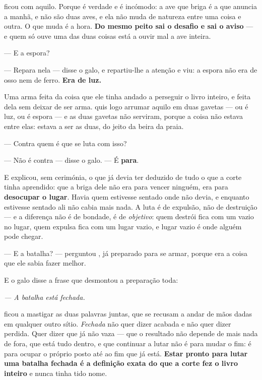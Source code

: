 \documentclass[livro.tex]{subfiles}
\begin{document}
\medskip
\noindent \Ben ficou com aquilo. Porque é verdade e é incómodo: a ave que
briga é a que anuncia a manhã, e não são duas aves, e ela não muda de natureza
entre uma coisa e outra. O que muda é a hora. \textbf{Do mesmo peito sai o
desafio e sai o aviso} --- e quem só ouve uma das duas coisas está a ouvir mal
a ave inteira.

\medskip
\noindent --- E a espora?

--- Repara nela --- disse o galo, e \Ben repartiu-lhe a atenção e viu: a
espora não era de osso nem de ferro. \textbf{Era de luz.}

\medskip
\noindent Uma arma feita da coisa que ele tinha andado a perseguir o livro
inteiro, e feita dela sem deixar de ser arma. \Ben quis logo arrumar aquilo
em duas gavetas --- ou é luz, ou é espora --- e as duas gavetas não serviram,
porque a coisa não estava entre elas: estava a ser as duas, do jeito da beira da
praia.

\medskip
\noindent --- Contra quem é que se luta com isso?

--- Não é contra --- disse o galo. --- É \textbf{para}.

\medskip
\noindent E explicou, sem cerimónia, o que \Ben já devia ter deduzido de tudo
o que a corte tinha aprendido: que a briga dele não era para vencer ninguém, era
para \textbf{desocupar o lugar}. Havia quem estivesse sentado onde não devia, e
enquanto estivesse sentado ali não cabia mais nada. A luta é de expulsão, não de
destruição --- e a diferença não é de bondade, é de \emph{objetivo}: quem
destrói fica com um vazio no lugar, quem expulsa fica com um lugar vazio, e
lugar vazio é onde alguém pode chegar.

\medskip
\noindent --- E a batalha? --- perguntou \Ben , já preparado para se armar,
porque era a coisa que ele sabia fazer melhor.

\medskip
\noindent E o galo disse a frase que desmontou a preparação toda:

\begin{center}
\emph{--- A batalha está fechada.}
\end{center}

\medskip
\noindent \Ben ficou a mastigar as duas palavras juntas, que se recusam a
andar de mãos dadas em qualquer outro sítio. \emph{Fechada} não quer dizer
acabada e não quer dizer perdida. Quer dizer que já não vaza --- que o resultado
não depende de mais nada de fora, que está tudo dentro, e que continuar a lutar
não é para mudar o fim: é para ocupar o próprio posto até ao fim que já está.
\textbf{Estar pronto para lutar uma batalha fechada é a definição exata do que a
corte fez o livro inteiro} e nunca tinha tido nome.
\end{document}
